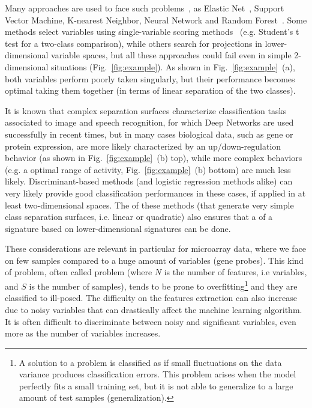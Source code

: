 \documentclass{standalone}
\begin{document}
Many approaches are used to face such problems~\cite{Guyon2002}, as Elastic Net~\cite{Hughey2015}, Support Vector Machine, K-nearest Neighbor, Neural Network and Random Forest~\cite{Pang2012}.
Some methods select variables using single-variable scoring methods~\cite{Eckhard2012, Hocking1976} (e.g. Student's t test for a two-class comparison), while others search for projections in lower-dimensional variable spaces, but all these approaches could fail even in simple 2-dimensional situations (Fig.~\ref{fig:example}).
As shown in Fig.~\ref{fig:example}~(a), both variables perform poorly taken singularly, but their performance becomes optimal taking them together (in terms of linear separation of the two classes).

It is known that complex separation surfaces characterize classification tasks associated to image and speech recognition, for which Deep Networks are used successfully in recent times, but in many cases biological data, such as gene or protein expression, are more likely characterized by an up/down-regulation behavior (as shown in Fig.~\ref{fig:example}~(b) top), while more complex behaviors (e.g. a  optimal range of activity, Fig.~\ref{fig:example}~(b) bottom) are much less likely.
Discriminant-based methods (and logistic regression methods alike) can very likely provide good classification performances in these cases, if applied in at least two-dimensional spaces.
The  of these methods (that generate very simple class separation surfaces, i.e. linear or quadratic) also ensures that a  of a signature based on lower-dimensional signatures can be done.

These considerations are relevant in particular for microarray data, where we face on few samples compared to a huge amount of variables (gene probes).
This kind of problem, often called  problem (where $N$ is the number of features, i.e variables, and $S$ is the number of samples), tends to be prone to overfitting\footnote{
  A solution to a problem is classified as  if small fluctuations on the data variance produces classification errors.
  This problem arises when the model perfectly fits a small training set, but it is not able to generalize to a large amount of test samples (generalization).
} and they are classified to ill-posed.
The difficulty on the features extraction can also increase due to noisy variables that can drastically affect the machine learning algorithm.
It is often difficult to discriminate between noisy and significant variables, even more as the number of variables increases.
\end{document}
